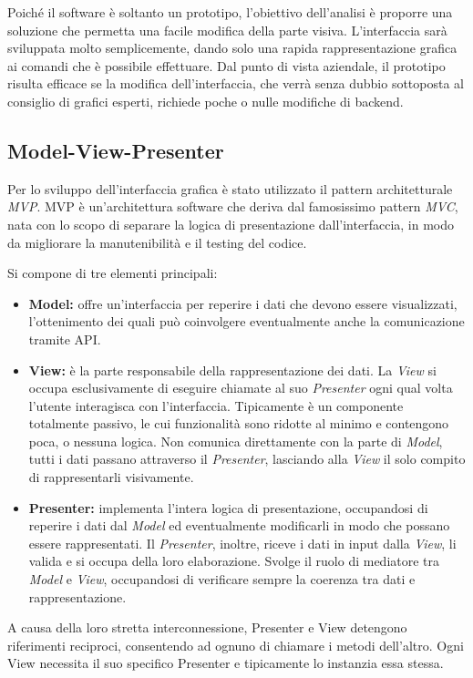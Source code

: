 \documentclass[12pt,a4paper,openright,twoside]{book}
\newcommand{\itemdef}[1]{\item \textbf{#1}}
\begin{document}
Poiché il software è soltanto un prototipo, l'obiettivo dell'analisi è proporre una soluzione che permetta una facile modifica della parte visiva.
L'interfaccia sarà sviluppata molto semplicemente, dando solo una rapida rappresentazione grafica ai comandi che è possibile effettuare.
Dal punto di vista aziendale, il prototipo risulta efficace se la modifica dell'interfaccia, che verrà senza dubbio sottoposta al consiglio di grafici esperti, richiede poche o nulle modifiche di backend.

\subsection{Model-View-Presenter}

Per lo sviluppo dell'interfaccia grafica è stato utilizzato il pattern architetturale \textit{\gls{MVP}}.
\gls{MVP} è un'architettura software che deriva dal famosissimo pattern \textit{\gls{MVC}}, nata con lo scopo di separare la logica di presentazione dall'interfaccia, in modo da migliorare la manutenibilità e il testing del codice.

Si compone di tre elementi principali:
\begin{itemize}
	\itemdef{Model:}
	offre un'interfaccia per reperire i dati che devono essere visualizzati, l'ottenimento dei quali può coinvolgere eventualmente anche la comunicazione tramite API.
	
	\itemdef{View:}
	è la parte responsabile della rappresentazione dei dati.
	La \textit{View} si occupa esclusivamente di eseguire chiamate al suo \textit{Presenter} ogni qual volta l'utente interagisca con l'interfaccia.
	Tipicamente è un componente totalmente passivo, le cui funzionalità sono ridotte al minimo e contengono poca, o nessuna logica.
	Non comunica direttamente con la parte di \textit{Model}, tutti i dati passano attraverso il \textit{Presenter}, lasciando alla \textit{View} il solo compito di rappresentarli visivamente.
	
	\itemdef{Presenter:} implementa l'intera logica di presentazione, occupandosi
	di reperire i dati dal \textit{Model} ed eventualmente modificarli in modo che
	possano essere rappresentati.
	Il \textit{Presenter}, inoltre, riceve i dati in input dalla \textit{View}, li valida e si occupa della loro elaborazione.
	Svolge il ruolo di mediatore tra \textit{Model} e \textit{View}, occupandosi di verificare sempre la coerenza tra dati e rappresentazione.
\end{itemize}
A causa della loro stretta interconnessione, Presenter e View detengono riferimenti reciproci, consentendo ad ognuno di chiamare i metodi dell'altro.
Ogni View necessita il suo specifico Presenter e tipicamente lo instanzia essa stessa.
\end{document}
